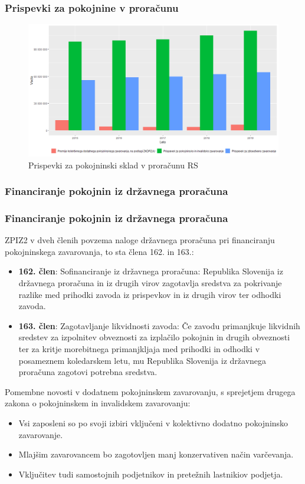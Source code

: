 \documentclass[10pt]{beamer}
\begin{document}
\begin{frame}
	\frametitle{Prispevki za pokojnine v proračunu}
	\begin{figure}[h]
	\centering
	\includegraphics[width = 10 cm]{prispevki_delodajalcev_za_socialno_varnost_graf.png}
	\caption{Prispevki za pokojninski sklad v proračunu RS}
	\label{Slika 3}
	\end{figure}
\end {frame}

\begin{frame}
\subsubsection[Financiranje pokojnin iz državnega proračuna]{Financiranje pokojnin iz državnega proračuna}
	\frametitle{Financiranje pokojnin iz državnega proračuna}
	ZPIZ2 v dveh členih povzema naloge državnega proračuna pri financiranju pokojninskega zavarovanja, to sta 	člena 162. in 163.:
	\begin{itemize}
	\item \textbf{162. člen}: Sofinanciranje iz državnega proračuna: Republika Slovenija iz državnega proračuna in iz drugih virov zagotavlja sredstva za pokrivanje razlike med 				prihodki zavoda iz prispevkov in iz drugih virov ter odhodki zavoda.
	\item \textbf{163. člen}: Zagotavljanje likvidnosti zavoda: Če zavodu primanjkuje likvidnih sredstev za izpolnitev obveznosti za izplačilo pokojnin in drugih obveznosti 				ter za kritje morebitnega primanjkljaja med prihodki in odhodki v posameznem koledarskem letu, mu Republika Slovenija iz državnega proračuna zagotovi potrebna 				sredstva.
\end{itemize}

Pomembne novosti v dodatnem pokojninskem zavarovanju, s sprejetjem drugega zakona o  pokojninskem in invalidskem zavarovanju:
\begin{itemize}
	\item Vsi zaposleni so po svoji izbiri vključeni v kolektivno dodatno pokojninsko zavarovanje.
	\item Mlajšim zavarovancem bo zagotovljen manj konzervativen način varčevanja.
	\item Vključitev tudi samostojnih podjetnikov in pretežnih lastnikiov podjetja.
\end{itemize}
\end{frame}
\end{document}
